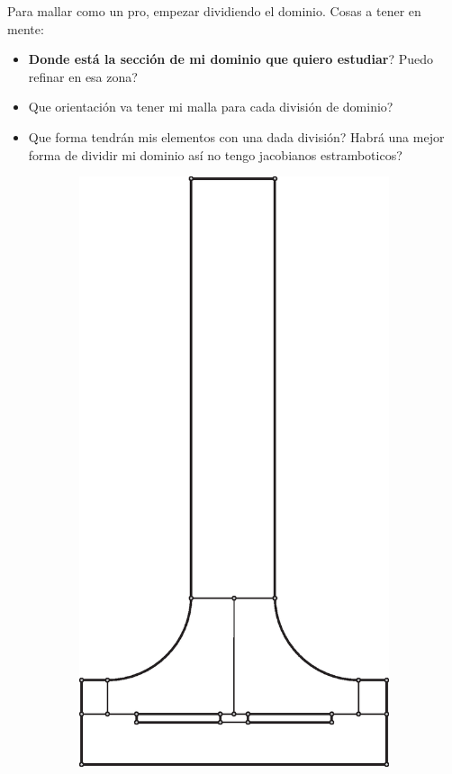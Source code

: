 \documentclass[11pt, a4paper,titlepage]{article}
\begin{document}
Para mallar como un pro, empezar dividiendo el dominio. Cosas a tener en mente:
\begin{itemize}
	\item \textbf{Donde está la sección de mi dominio que quiero estudiar}? Puedo refinar en esa zona?
	\item Que orientación va tener mi malla para cada división de dominio?
	\item Que forma tendrán mis elementos con una dada división? Habrá una mejor forma de dividir mi dominio así no tengo jacobianos estramboticos?
\end{itemize}


\begin{figure}[htb!]
	\centering
	\begin{subfigure}{0.49\textwidth}
		\centering
		\includegraphics[width=.7\linewidth]{fig/divisionPelton1.eps}

\end{subfigure}
\end{figure}
\end{document}
